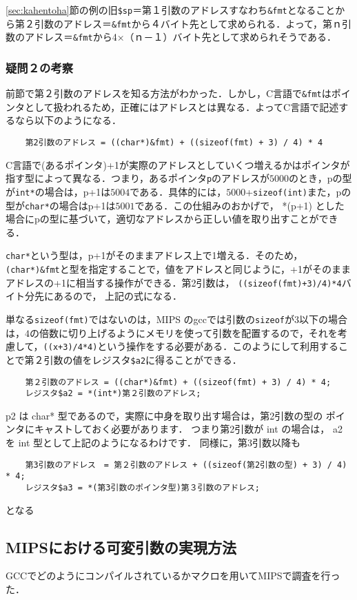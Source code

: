 \documentclass[a4j,11pt]{jarticle}
\begin{document}
  \ref{sec:kahentoha}節の例の旧\verb|$sp|＝第１引数のアドレスすなわち\verb|&fmt|となることから第２引数のアドレス＝\verb|&fmt|から４バイト先として求められる．よって，第ｎ引数のアドレス＝\verb|&fmt|から4×（ｎ－１）バイト先として求められそうである．

  \subsubsection{疑問２の考察}
  前節で第２引数のアドレスを知る方法がわかった．しかし，C言語で\verb|&fmt|はポインタとして扱われるため，正確にはアドレスとは異なる．よってC言語で記述するなら以下のようになる．
  \begin{verbatim}
    第2引数のアドレス = ((char*)&fmt) + ((sizeof(fmt) + 3) / 4) * 4
  \end{verbatim}
  C言語で(あるポインタ)+1が実際のアドレスとしていくつ増えるかはポインタが指す型によって異なる．つまり，あるポインタ\verb|p|のアドレスが$5000$のとき，pの型が\verb|int*|の場合は，p+1は$5004$である．具体的には，$5000$+\verb|sizeof(int)|また，pの型が\verb|char*|の場合はp+1は$5001$である．この仕組みのおかげで， *(p+1) とした場合にpの型に基づいて，適切なアドレスから正しい値を取り出すことができる．
  
  \verb|char*|という型は，p+1がそのままアドレス上で1増える．そのため，\verb|(char*)&fmt|と型を指定することで，値をアドレスと同じように，+1がそのままアドレスの+1に相当する操作ができる．第2引数は， \verb|((sizeof(fmt)+3)/4)*4|バイト分先にあるので， 上記の式になる．
  
  単なる\verb|sizeof(fmt)|ではないのは，MIPS のgccでは引数の\verb|sizeof|が$3$以下の場合は，$4$の倍数に切り上げるようにメモリを使って引数を配置するので，それを考慮して，\verb|((x+3)/4*4)|という操作をする必要がある．このようにして利用することで第２引数の値をレジスタ\verb|$a2|に得ることができる．
  \begin{verbatim}
    第２引数のアドレス = ((char*)&fmt) + ((sizeof(fmt) + 3) / 4) * 4;
    レジスタ$a2 = *(int*)第２引数のアドレス;
  \end{verbatim}
  p2 は char* 型であるので，実際に中身を取り出す場合は，第2引数の型の ポインタにキャストしておく必要があります． つまり第2引数が int の場合は， a2 を int 型として上記のようになるわけです．
  同様に，第3引数以降も
  \begin{verbatim}
    第3引数のアドレス　= 第２引数のアドレス + ((sizeof(第2引数の型) + 3) / 4) * 4;
    レジスタ$a3 = *(第3引数のポインタ型)第３引数のアドレス;
  \end{verbatim}
  となる
  \subsection{MIPSにおける可変引数の実現方法}
  GCCでどのようにコンパイルされているかマクロを用いてMIPSで調査を行った．
\end{document}
